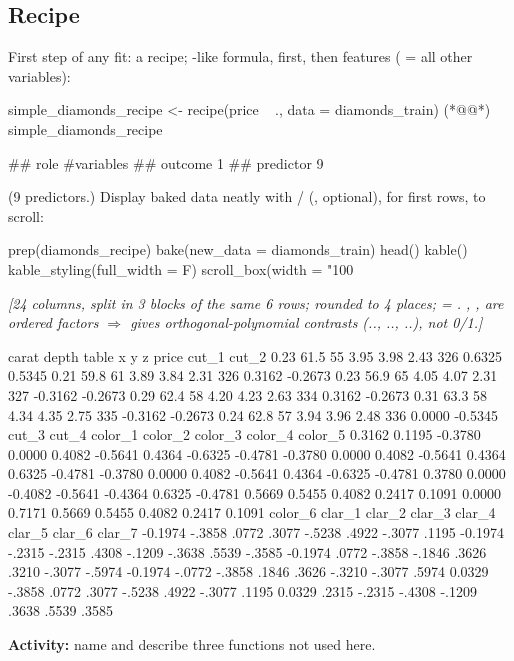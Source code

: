 \subsection{Recipe}
%
First step of any  fit: a recipe; -like formula,  first, then features ( = all other variables):
\begin{rcode}
simple_diamonds_recipe <-
  recipe(price ~ ., data = diamonds_train)   (*@@*)
simple_diamonds_recipe
\end{rcode}
\begin{routput}
##       role #variables
##    outcome          1
##  predictor          9
\end{routput}
(9 predictors.) Display baked data neatly with / (, optional),  for first rows,  to scroll:
\begin{rcode}
prep(diamonds_recipe) %
  bake(new_data = diamonds_train) %
  head() %
  kable() %
  kable_styling(full_width = F) %
  scroll_box(width = "100%
\end{rcode}
{\color{figgray}\itshape [24 columns, split in 3 blocks of the same 6 rows; rounded to 4 places;  = . , ,  are \emph{ordered} factors $\Rightarrow$  gives orthogonal-polynomial contrasts (.., .., ..), not 0/1.]}
\begin{routput}
carat depth table    x    y    z price   cut_1   cut_2
 0.23  61.5    55 3.95 3.98 2.43   326  0.6325  0.5345
 0.21  59.8    61 3.89 3.84 2.31   326  0.3162 -0.2673
 0.23  56.9    65 4.05 4.07 2.31   327 -0.3162 -0.2673
 0.29  62.4    58 4.20 4.23 2.63   334  0.3162 -0.2673
 0.31  63.3    58 4.34 4.35 2.75   335 -0.3162 -0.2673
 0.24  62.8    57 3.94 3.96 2.48   336  0.0000 -0.5345
  cut_3   cut_4 color_1 color_2 color_3 color_4 color_5
 0.3162  0.1195 -0.3780  0.0000  0.4082 -0.5641  0.4364
-0.6325 -0.4781 -0.3780  0.0000  0.4082 -0.5641  0.4364
 0.6325 -0.4781 -0.3780  0.0000  0.4082 -0.5641  0.4364
-0.6325 -0.4781  0.3780  0.0000 -0.4082 -0.5641 -0.4364
 0.6325 -0.4781  0.5669  0.5455  0.4082  0.2417  0.1091
 0.0000  0.7171  0.5669  0.5455  0.4082  0.2417  0.1091
color_6 clar_1 clar_2 clar_3 clar_4 clar_5 clar_6 clar_7
-0.1974 -.3858  .0772  .3077 -.5238  .4922 -.3077  .1195
-0.1974 -.2315 -.2315  .4308 -.1209 -.3638  .5539 -.3585
-0.1974  .0772 -.3858 -.1846  .3626  .3210 -.3077 -.5974
-0.1974 -.0772 -.3858  .1846  .3626 -.3210 -.3077  .5974
 0.0329 -.3858  .0772  .3077 -.5238  .4922 -.3077  .1195
 0.0329  .2315 -.2315 -.4308 -.1209  .3638  .5539  .3585
\end{routput}
\textbf{Activity:} name and describe three  functions not used here.

